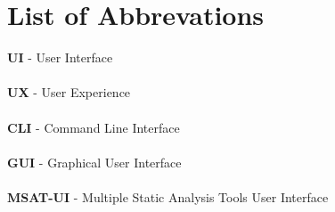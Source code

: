 \chapter{List of Abbrevations}

\textbf{UI} - User Interface \\ \\
\textbf{UX} - User Experience \\ \\
\textbf{CLI} - Command Line Interface \\ \\
\textbf{GUI} - Graphical User Interface \\ \\
\textbf{MSAT-UI} - Multiple Static Analysis Tools User Interface \\ \\